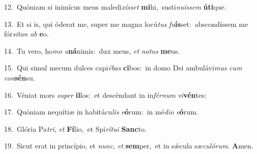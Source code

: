{\numbfont\textcolor{\numbcolor}{12.}}~Quóniam si inimícus meus maledi\-\textit{xís}\-\textit{set} \textbf{mi}\-hi,~\star susti\-\textit{nu}\-\textit{ís}\textit{sem} \textbf{ú}\-\textbf{ti}que.\par
{\numbfont\textcolor{\numbcolor}{13.}}~Et si is, qui óderat me, super me magna locú\textit{tus} \textit{fu}\-\textbf{ís}set:~\star abscondíssem me fór\-\textit{si}\-\textit{tan} \textit{ab} \textbf{e}\-o.\par
{\numbfont\textcolor{\numbcolor}{14.}}~Tu vero, ho\textit{mo} \textit{u}\-\textbf{ná}nimis:~\star dux meus, \textit{et} \textit{no}\-\textit{tus} \textbf{me}\-us.\par
{\numbfont\textcolor{\numbcolor}{15.}}~Qui simul mecum dulces capi\-\textit{é}\-\textit{bas} \textbf{ci}\-bos:~\star in domo Dei ambulávi\textit{mus} \textit{cum} \textit{con}\-\textbf{sén}su.\par
{\numbfont\textcolor{\numbcolor}{16.}}~Véniat mors \textit{su}\-\textit{per} \textbf{il}\-los:~\star et descéndant in in\-\textit{fér}\-\textit{num} \textit{vi}\-\textbf{vén}tes:\par
{\numbfont\textcolor{\numbcolor}{17.}}~Quóniam nequítiæ in habitácu\textit{lis} \textit{e}\-\textbf{ó}rum:~\star in mé\-\textit{di}\-\textit{o} \textit{e}\-\textbf{ó}rum.\par
{\numbfont\textcolor{\numbcolor}{18.}}~Glória Pa\-\textit{tri}\-, \textit{et} \textbf{Fí}\-lio,~\star et Spi\-\textit{rí}\-\textit{tu}\textit{i} \textbf{Sanc}\-to.\par
{\numbfont\textcolor{\numbcolor}{19.}}~Sicut erat in princípio, et \textit{nunc}\-, \textit{et} \textbf{sem}\-per,~\star et in sǽcula sæ\-\textit{cu}\-\textit{ló}\textit{rum}. \textbf{A}\-men.\par
